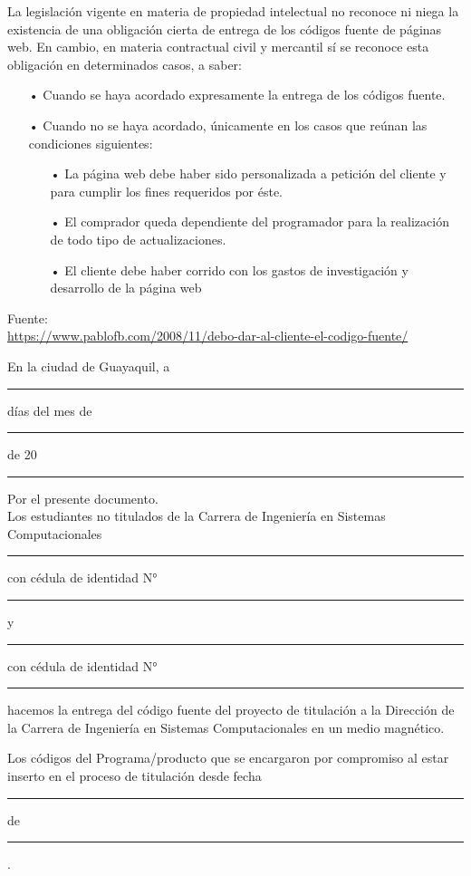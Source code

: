 \documentclass[12pt, a4paper, nofontenc, numbers=endperiod]{apa7}
\begin{document}
{\setlength{\parindent}{1.27cm}La legislación vigente en materia de propiedad intelectual no reconoce ni niega la existencia de una obligación cierta de entrega de los códigos fuente de páginas web. En cambio, en materia contractual civil y mercantil sí se reconoce esta obligación en determinados casos, a saber:
{\doublespacing	
	\begin{itemize}[leftmargin=1.70cm]	
		\item[•]Cuando se haya acordado expresamente la entrega de los códigos fuente.
		\item[•]Cuando no se haya acordado, únicamente en los casos que reúnan las condiciones siguientes:
		\begin{itemize}
			\item[•]La página web debe haber sido personalizada a petición del cliente y para cumplir los fines requeridos por éste.
			\item[•]El comprador queda dependiente del programador para la realización de todo tipo de actualizaciones.
			\item[•]El cliente debe haber corrido con los gastos de investigación y desarrollo de la página web
		\end{itemize}
	\end{itemize}
}
\setlength{\parindent}{0cm}Fuente:\\ {\footnotesize\url{https://www.pablofb.com/2008/11/debo-dar-al-cliente-el-codigo-fuente/}}

\newpage

\begin{flushright}
	En la ciudad de Guayaquil, a \rule[0mm]{10mm}{0.1mm} días del mes de \rule[0mm]{10mm}{0.1mm} de 20 \rule[0mm]{10mm}{0.1mm}
\end{flushright}
Por el presente documento. \\

\setlength{\parindent}{1.27cm}Los estudiantes no titulados de la Carrera de Ingeniería en Sistemas Computacionales \rule[0mm]{60mm}{0.1mm} con cédula de identidad N° \rule[0mm]{50mm}{0.1mm} y \rule[0mm]{60mm}{0.1mm} con cédula de identidad N° \rule[0mm]{50mm}{0.1mm} hacemos la entrega del código fuente del proyecto de titulación a la Dirección de la Carrera de Ingeniería en Sistemas Computacionales en un medio magnético.

\setlength{\parindent}{1.27cm}Los códigos del Programa/producto que se encargaron por compromiso al estar inserto en el proceso de titulación desde fecha \rule[0mm]{10mm}{0.1mm} de \rule[0mm]{20mm}{0.1mm}.

}
\end{document}
